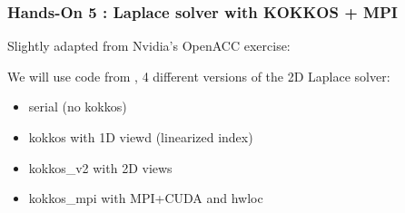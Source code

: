 \begin{frame}
  \frametitle{Hands-On 5 : Laplace solver with KOKKOS + MPI}

  Slightly adapted from Nvidia's OpenACC exercise:\\

  We will use code from , 4 different versions of the 2D Laplace solver:
  \begin{itemize}
  \item serial (no kokkos)
  \item kokkos with 1D viewd (linearized index)
  \item kokkos\_v2 with 2D views
  \item kokkos\_mpi with MPI+CUDA and hwloc
  \end{itemize}
  
\end{frame}

